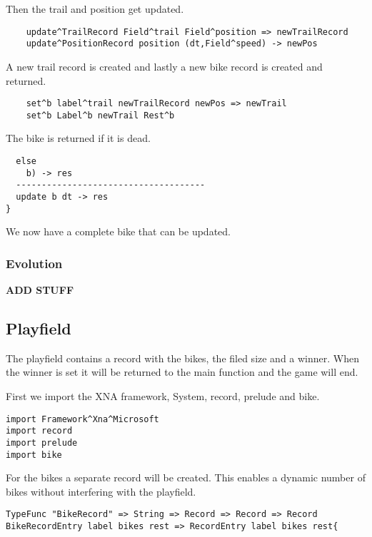 Then the trail and position get updated.

\begin{lstlisting}
    update^TrailRecord Field^trail Field^position => newTrailRecord
    update^PositionRecord position (dt,Field^speed) -> newPos
\end{lstlisting}

A new trail record is created and lastly a new bike record is created and returned.

\begin{lstlisting}
    set^b label^trail newTrailRecord newPos => newTrail
    set^b Label^b newTrail Rest^b
\end{lstlisting}

The bike is returned if it is dead.

\begin{lstlisting}
  else
    b) -> res
  -------------------------------------
  update b dt -> res
}
\end{lstlisting}

We now have a complete bike that can be updated.


\subsubsection{Evolution}
\textbf{ADD STUFF}


\subsection{Playfield}
The playfield contains a record with the bikes, the filed size and a winner.
When the winner is set it will be returned to the main function and the game will end.

First we import the XNA framework, System, record, prelude and bike.
\begin{lstlisting}
import Framework^Xna^Microsoft
import record
import prelude
import bike
\end{lstlisting}

For the bikes a separate record will be created.
This enables a dynamic number of bikes without interfering with the playfield.

\begin{lstlisting}
TypeFunc "BikeRecord" => String => Record => Record => Record
BikeRecordEntry label bikes rest => RecordEntry label bikes rest{
\end{lstlisting}

